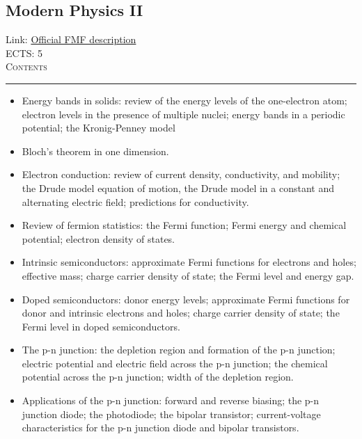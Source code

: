 \documentclass[11pt, a4paper]{article}
\newenvironment{course}[3]{
\subsection{#1}%
Link: \href{#2}{Official FMF description}\\%
ECTS: #3%
\vspace{1ex}
\\
{\large \textsc{Contents}}\\[-0.9ex]%
\rule{\textwidth}{0.5pt}
\vspace{-3ex}
}
{}
\newenvironment{chapter}[1]{
\begin{tcolorbox}[title=#1, breakable]
}
{\end{tcolorbox}}
\begin{document}
\begin{course}{Modern Physics II}{https://www.fmf.uni-lj.si/en/study-physics/programmes/1fiz/2020/7000777/courses/1162/}{5}
    \label{modern_physics_2}

    \begin{chapter}{Introduction to solid state physics}
        \begin{itemize}
        
            \item Energy bands in solids: review of the energy levels of the one-electron atom; electron levels in the presence of multiple nuclei; energy bands in a periodic potential; the Kronig-Penney model

            \item Bloch's theorem in one dimension.

            \item Electron conduction:  review of current density, conductivity, and mobility; the Drude model equation of motion, the Drude model in a constant and alternating electric field; predictions for conductivity.

            \item Review of fermion statistics: the Fermi function; Fermi energy and chemical potential; electron density of states.

            \item Intrinsic semiconductors: approximate Fermi functions for electrons and holes; effective mass; charge carrier density of state; the Fermi level and energy gap.
            \item Doped semiconductors: donor energy levels; approximate Fermi functions for donor and intrinsic electrons and holes; charge carrier density of state; the Fermi level in doped semiconductors.

            \item The p-n junction: the depletion region and formation of the p-n junction; electric potential and electric field across the p-n junction; the chemical potential across the p-n junction; width of the depletion region.

            \item Applications of the p-n junction: forward and reverse biasing; the p-n junction diode; the photodiode; the bipolar transistor; current-voltage characteristics for the p-n junction diode and bipolar transistors.

        \end{itemize}
        

\end{chapter}
\end{course}
\end{document}
